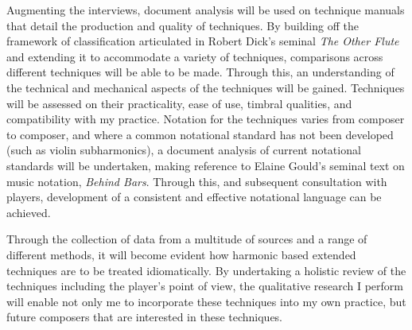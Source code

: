 Augmenting the interviews, document analysis will be used on technique manuals that detail the production and quality of techniques. 
By building off the framework of classification articulated in Robert Dick’s seminal \emph{The Other Flute} and extending it to accommodate a variety of techniques, comparisons across different techniques will be able to be made.\autocite{dickOtherFlute1989} 
Through this, an understanding of the technical and mechanical aspects of the techniques will be gained. Techniques will be assessed on their practicality, ease of use, timbral qualities, and compatibility with my practice. 
Notation for the techniques varies from composer to composer, and where a common notational standard has not been developed (such as violin subharmonics), a document analysis of current notational standards will be undertaken, making reference to Elaine Gould’s seminal text on music notation, \emph{Behind Bars}.\autocite{gouldBars2011} 
Through this, and subsequent consultation with players, development of a consistent and effective notational language can be achieved.

Through the collection of data from a multitude of sources and a range of different methods, it will become evident how harmonic based extended techniques are to be treated idiomatically. 
By undertaking a holistic review of the techniques including the player's point of view, the qualitative research I perform will enable not only me to incorporate these techniques into my own practice, but future composers that are interested in these techniques.





